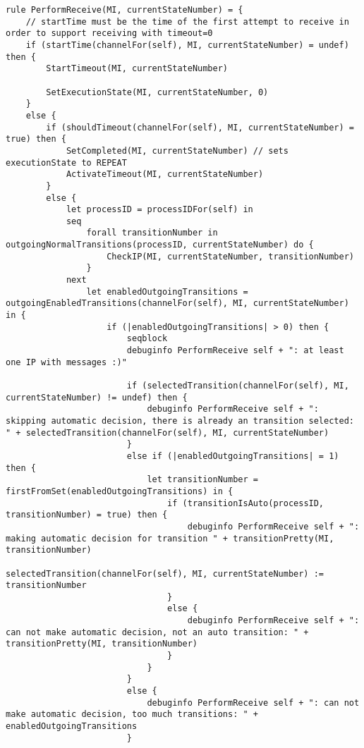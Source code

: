 \begin{listing}[H]
\begin{verbatim}
rule PerformReceive(MI, currentStateNumber) = {
    // startTime must be the time of the first attempt to receive in order to support receiving with timeout=0
    if (startTime(channelFor(self), MI, currentStateNumber) = undef) then {
        StartTimeout(MI, currentStateNumber)

        SetExecutionState(MI, currentStateNumber, 0)
    }
    else {
        if (shouldTimeout(channelFor(self), MI, currentStateNumber) = true) then {
            SetCompleted(MI, currentStateNumber) // sets executionState to REPEAT
            ActivateTimeout(MI, currentStateNumber)
        }
        else {
            let processID = processIDFor(self) in
            seq
                forall transitionNumber in outgoingNormalTransitions(processID, currentStateNumber) do {
                    CheckIP(MI, currentStateNumber, transitionNumber)
                }
            next
                let enabledOutgoingTransitions = outgoingEnabledTransitions(channelFor(self), MI, currentStateNumber) in {
                    if (|enabledOutgoingTransitions| > 0) then {
                        seqblock
                        debuginfo PerformReceive self + ": at least one IP with messages :)"

                        if (selectedTransition(channelFor(self), MI, currentStateNumber) != undef) then {
                            debuginfo PerformReceive self + ": skipping automatic decision, there is already an transition selected: " + selectedTransition(channelFor(self), MI, currentStateNumber)
                        }
                        else if (|enabledOutgoingTransitions| = 1) then {
                            let transitionNumber = firstFromSet(enabledOutgoingTransitions) in {
                                if (transitionIsAuto(processID, transitionNumber) = true) then {
                                    debuginfo PerformReceive self + ": making automatic decision for transition " + transitionPretty(MI, transitionNumber)
                                    selectedTransition(channelFor(self), MI, currentStateNumber) := transitionNumber
                                }
                                else {
                                    debuginfo PerformReceive self + ": can not make automatic decision, not an auto transition: " + transitionPretty(MI, transitionNumber)
                                }
                            }
                        }
                        else {
                            debuginfo PerformReceive self + ": can not make automatic decision, too much transitions: " + enabledOutgoingTransitions
                        }


\end{verbatim}
\end{listing}
